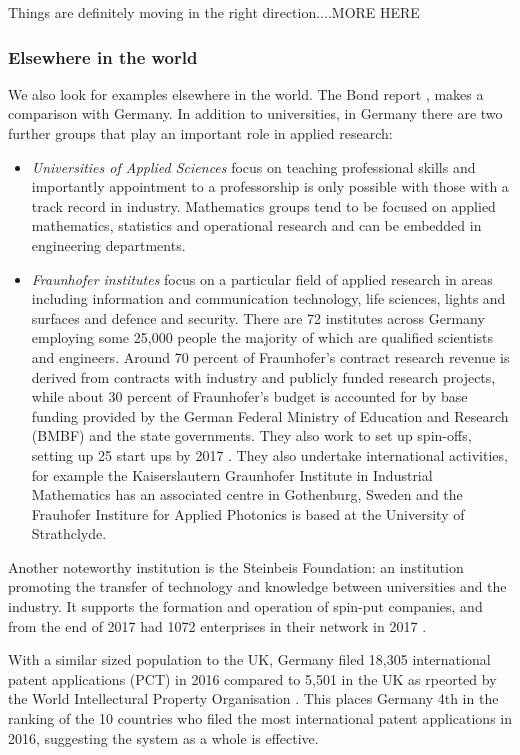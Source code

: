 \documentclass[11pt]{article} %
\begin{document}
Things are definitely moving in the right direction....MORE HERE
	\subsubsection{Elsewhere in the world }	
	
	We also look for examples elsewhere in the world. The Bond report \cite{Bond}, makes a comparison with Germany.   In addition to universities, in Germany there are two further groups that play an important role in applied research:
	\begin{itemize}
		\item \textit{Universities of Applied Sciences} focus on teaching professional skills and importantly appointment to a professorship is only possible with those with a track record in industry. Mathematics groups tend to be focused on applied mathematics, statistics and operational research and can be embedded in engineering departments. 
		\item \textit{Fraunhofer institutes} focus on a particular field of applied research in areas including information and communication technology, life sciences, lights and surfaces and defence and security. There are 72 institutes across Germany employing some 25,000 people the majority of which are qualified scientists and engineers. Around 70 percent of Fraunhofer’s contract research revenue is derived from contracts with industry and publicly funded research projects, while about	30 percent of Fraunhofer’s budget is accounted for by
		base funding provided by the German Federal Ministry of	Education and Research (BMBF) and the state governments. They also work to set up spin-offs, setting up 25 start ups by 2017 \cite{Thum2017}. They also undertake international activities, for example the Kaiserslautern Graunhofer Institute in Industrial Mathematics has an associated centre in Gothenburg, Sweden and the Frauhofer Institure for Applied Photonics is based at the University of Strathclyde. 
	\end{itemize}

	Another noteworthy institution is the Steinbeis Foundation: an institution promoting the transfer of technology and knowledge between universities and the industry. It supports the formation and operation of spin-put companies, and from the end of 2017 had 1072 enterprises in their network in 2017 \cite{Steinbeis}.
	
	With a similar sized population to the UK, Germany filed 18,305 international patent applications (PCT) in 2016 compared to 5,501 in the UK as rpeorted by the World Intellectural Property Organisation \cite{WIPO}. This places Germany 4th in the ranking of the 10 countries who filed the most international patent applications in 2016, suggesting the system as a whole is effective. 
		
\end{document}
